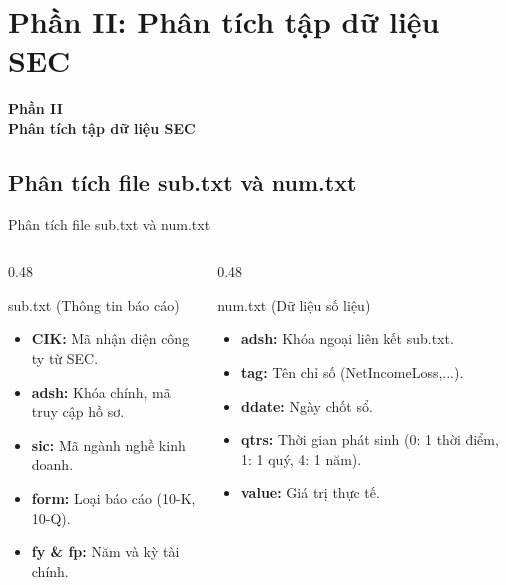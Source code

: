 \documentclass[t, aspectratio=169]{beamer} %
\begin{document}
	\useStyleLogoOnly 
	\useThickBar      
	
	\section{Phần II: Phân tích tập dữ liệu SEC}
	\begin{frame}
		\vfill
		\centering
		{\Huge \textbf{Phần II}} \\[1em]
		{\huge \textbf{Phân tích tập dữ liệu SEC}}
		\vfill
	\end{frame}
	
	\subsection{Phân tích file sub.txt và num.txt}
	\begin{frame}{Phân tích file sub.txt và num.txt}
		\begin{columns}[T]
			\begin{column}{0.48\textwidth}
				\begin{block}{sub.txt (Thông tin báo cáo)}
					\begin{itemize}
						\item \textbf{CIK:} Mã nhận diện công ty từ SEC.
						\item \textbf{adsh:} Khóa chính, mã truy cập hồ sơ.
						\item \textbf{sic:} Mã ngành nghề kinh doanh.
						\item \textbf{form:} Loại báo cáo (10-K, 10-Q).
						\item \textbf{fy \& fp:} Năm và kỳ tài chính.
					\end{itemize}
				\end{block}
			\end{column}
			
			\begin{column}{0.48\textwidth}
				\begin{block}{num.txt (Dữ liệu số liệu)}
					\begin{itemize}
						\item \textbf{adsh:} Khóa ngoại liên kết sub.txt.
						\item \textbf{tag:} Tên chỉ số (NetIncomeLoss,...).
						\item \textbf{ddate:} Ngày chốt sổ.
						\item \textbf{qtrs:} Thời gian phát sinh (0: 1 thời điểm, 1: 1 quý, 4: 1 năm).
						\item \textbf{value:} Giá trị thực tế.
					\end{itemize}
				\end{block}
			\end{column}
		\end{columns}
	\end{frame}
\end{document}
